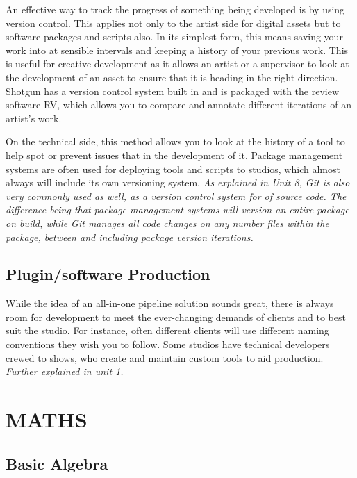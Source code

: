 An effective way to track the progress of something being developed is by using version control. This applies not only to the artist side for digital assets but to software packages and scripts also. In its simplest form, this means saving your work into at sensible intervals and keeping a history of your previous work. This is useful for creative development as it allows an artist or a supervisor to look at the development of an asset to ensure that it is heading in the right direction. Shotgun has a version control system built in and is packaged with the review software RV, which allows you to compare and annotate different iterations of an artist's work.

On the technical side, this method allows you to look at the history of a tool to help spot or prevent issues that in the development of it. Package management systems are often used for deploying tools and scripts to studios, which almost always will include its own versioning system. \emph{As explained in Unit 8, Git is also very commonly used as well, as a version control system for of source code. The difference being that package management systems will version an entire package on build, while Git manages all code changes on any number files within the package, between and including package version iterations.}

\hypertarget{pluginsoftware-production}{%
\subsection{Plugin/software Production}\label{pluginsoftware-production}}

While the idea of an all-in-one pipeline solution sounds great, there is always room for development to meet the ever-changing demands of clients and to best suit the studio. For instance, often different clients will use different naming conventions they wish you to follow. Some studios have technical developers crewed to shows, who create and maintain custom tools to aid production. \emph{Further explained in unit 1.}

\pagebreak\hypertarget{maths}{%
\section{MATHS}\label{maths}}

\hypertarget{basic-algebra}{%
\subsection{Basic Algebra}\label{basic-algebra}}

